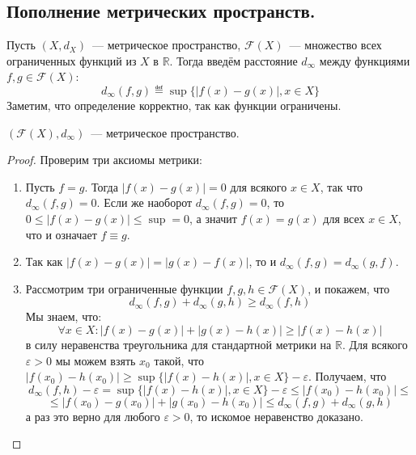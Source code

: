 \documentclass[11pt]{report}
\begin{document}
    \subsection{Пополнение метрических пространств.}

    \begin{definition}
    Пусть $(X, d_X)$~--- метрическое пространство, $\mathcal{F}(X)$~--- множество всех ограниченных функций из $X$ в $\mathbb{R}$. Тогда введём расстояние $d_{\infty}$ между функциями $f, g \in \mathcal{F}(X)$:
    \begin{equation*}
        d_{\infty}(f, g) \eqdef \sup\{|f(x) - g(x)|, x \in X\}
    \end{equation*}
    Заметим, что определение корректно, так как функции ограничены.
    \end{definition}

    \begin{lemma}

    $(\mathcal{F}(X), d_{\infty})$~--- метрическое пространство.

    \end{lemma}

    \begin{proof}

     Проверим три аксиомы метрики:
    \begin{enumerate}
        \item Пусть $f = g$. Тогда $|f(x) - g(x)| = 0$ для всякого $x \in X$, так что $d_{\infty}(f, g) = 0$. Если же наоборот $d_{\infty}(f, g) = 0$, то $0 \leq |f(x) - g(x)| \leq \sup = 0$, а значит $f(x) = g(x)$ для всех $x \in X$, что и означает $f \equiv g$.
        \item Так как $|f(x) - g(x)| = |g(x) - f(x)|$, то и $d_{\infty}(f, g) = d_{\infty}(g, f)$.
        \item Рассмотрим три ограниченные функции $f, g, h \in \mathcal{F}(X)$, и покажем, что
        \begin{equation*}
            d_{\infty}(f, g) + d_{\infty}(g, h) \geq d_{\infty}(f, h)
        \end{equation*}
        Мы знаем, что:
        \begin{equation*}
            \forall x \in X: |f(x) - g(x)| + |g(x) - h(x)| \geq |f(x) - h(x)|
        \end{equation*}
        в силу неравенства треугольника для стандартной метрики на $\mathbb{R}$. Для всякого $\varepsilon > 0$ мы можем взять $x_0$ такой, что $|f(x_0) - h(x_0)| \geq \sup\{|f(x) - h(x)|, x \in X\} - \varepsilon$. Получаем, что
        \begin{equation*}
            d_{\infty}(f, h) - \varepsilon = \sup\{|f(x) - h(x)|, x \in X\} - \varepsilon \leq |f(x_0) - h(x_0)| \leq
        \end{equation*}
        \begin{equation*}
            \leq |f(x_0) - g(x_0)| + |g(x_0) - h(x_0)| \leq d_{\infty}(f, g) + d_{\infty}(g, h)
        \end{equation*}
        а раз это верно для любого $\varepsilon > 0$, то искомое неравенство доказано.
    \end{enumerate}
    \end{proof}
\end{document}
